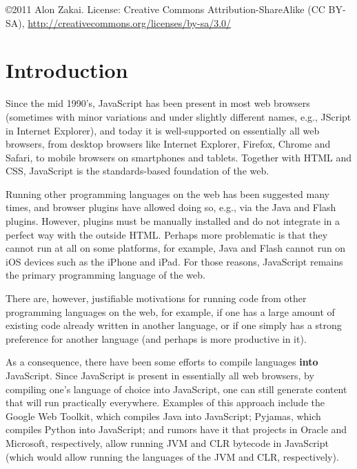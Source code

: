 \documentclass[11pt]{proc}
\begin{document}



\bigskip

\copyright 2011 Alon Zakai. License: Creative Commons Attribution-ShareAlike (CC BY-SA), \url{http://creativecommons.org/licenses/by-sa/3.0/}

\section{Introduction}

Since the mid 1990's, JavaScript has been present in most web browsers (sometimes
with minor variations and under slightly different names, e.g., JScript in Internet
Explorer), and today it is
well-supported on essentially all web browsers, from desktop browsers like
Internet Explorer, Firefox, Chrome and Safari, to mobile browsers on smartphones
and tablets. Together with HTML and CSS, JavaScript is the standards-based
foundation of the web.

Running other programming languages on the web has been suggested many times,
and browser plugins have allowed doing so, e.g., via the Java
and Flash plugins. However, plugins must be manually installed and do not integrate in
a perfect way with the outside HTML. Perhaps more problematic is that they cannot run
at all on some platforms, for example, Java and Flash cannot run on iOS devices such as the iPhone
and iPad. For those reasons, JavaScript remains
the primary programming language of the web.

There are, however, justifiable motivations for running code from
other programming languages on the web, for example, if one has a large
amount of existing code already written in another language, or if one
simply has a strong preference for another language (and perhaps is
more productive in it).

As a consequence, there have been some efforts to compile languages
\textbf{into} JavaScript. Since JavaScript is present in essentially all web
browsers, by compiling one's language of choice into JavaScript, one
can still generate content that will run practically everywhere.
Examples of this approach include the Google Web Toolkit, which compiles
Java into JavaScript; Pyjamas, which compiles Python into JavaScript;
and rumors have it that projects in Oracle and Microsoft, respectively,
allow running JVM and CLR bytecode in JavaScript (which would allow
running the languages of the JVM and CLR, respectively).
\end{document}
